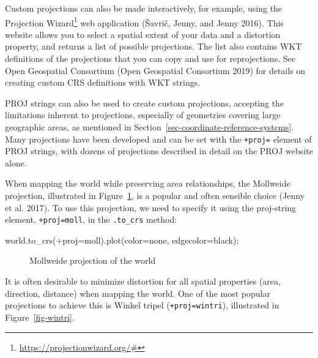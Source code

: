 \documentclass[
  letterpaper,
]{krantz}
\newenvironment{Shaded}{\begin{snugshade}}{\end{snugshade}}
\newcommand{\NormalTok}[1]{\textcolor[rgb]{0.00,0.23,0.31}{#1}}
\newcommand{\OperatorTok}[1]{\textcolor[rgb]{0.37,0.37,0.37}{#1}}
\newcommand{\StringTok}[1]{\textcolor[rgb]{0.13,0.47,0.30}{#1}}
\begin{document}
Custom projections can also be made interactively, for example, using
the Projection Wizard\footnote{\url{https://projectionwizard.org/\#}}
web application (Šavrič, Jenny, and Jenny 2016). This website allows you
to select a spatial extent of your data and a distortion property, and
returns a list of possible projections. The list also contains WKT
definitions of the projections that you can copy and use for
reprojections. See Open Geospatial Consortium (Open Geospatial
Consortium 2019) for details on creating custom CRS definitions with WKT
strings.

PROJ strings can also be used to create custom projections, accepting
the limitations inherent to projections, especially of geometries
covering large geographic areas, as mentioned in
Section~\ref{sec-coordinate-reference-systems}. Many projections have
been developed and can be set with the \texttt{+proj=} element of PROJ
strings, with dozens of projections described in detail on the PROJ
website alone.

When mapping the world while preserving area relationships, the
Mollweide projection, illustrated in Figure~\ref{fig-mollweide}, is a
popular and often sensible choice (Jenny et al. 2017). To use this
projection, we need to specify it using the proj-string element,
\texttt{\textquotesingle{}+proj=moll\textquotesingle{}}, in the
\texttt{.to\_crs} method:

\begin{Shaded}
\begin{Highlighting}[]
\NormalTok{world.to\_crs(}\StringTok{\textquotesingle{}+proj=moll\textquotesingle{}}\NormalTok{).plot(color}\OperatorTok{=}\StringTok{\textquotesingle{}none\textquotesingle{}}\NormalTok{, edgecolor}\OperatorTok{=}\StringTok{\textquotesingle{}black\textquotesingle{}}\NormalTok{)}\OperatorTok{;}
\end{Highlighting}
\end{Shaded}

\begin{figure}[H]


\caption{\label{fig-mollweide}Mollweide projection of the world}

\end{figure}%

It is often desirable to minimize distortion for all spatial properties
(area, direction, distance) when mapping the world. One of the most
popular projections to achieve this is Winkel tripel
(\texttt{\textquotesingle{}+proj=wintri\textquotesingle{}}), illustrated
in Figure~\ref{fig-wintri}.
\end{document}
